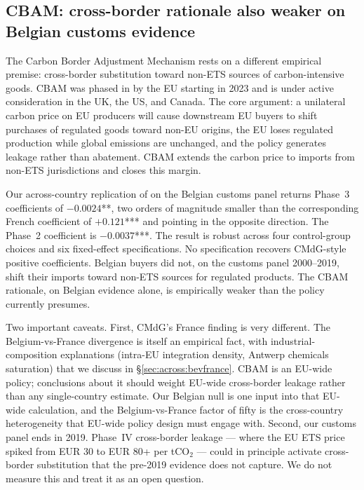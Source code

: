 \subsection{CBAM: cross-border rationale also weaker on Belgian customs evidence}

The Carbon Border Adjustment Mechanism rests on a different empirical premise: cross-border substitution toward non-ETS sources of carbon-intensive goods. CBAM was phased in by the EU starting in 2023 and is under active consideration in the UK, the US, and Canada. The core argument: a unilateral carbon price on EU producers will cause downstream EU buyers to shift purchases of regulated goods toward non-EU origins, the EU loses regulated production while global emissions are unchanged, and the policy generates leakage rather than abatement. CBAM extends the carbon price to imports from non-ETS jurisdictions and closes this margin.

Our across-country replication of \citet{CosterMejeanDiGiovanni2024} on the Belgian customs panel returns Phase~3 coefficients of $-0.0024$**, two orders of magnitude smaller than the corresponding French coefficient of $+0.121$*** and pointing in the opposite direction. The Phase~2 coefficient is $-0.0037$***. The result is robust across four control-group choices and six fixed-effect specifications. No specification recovers CMdG-style positive coefficients. Belgian buyers did not, on the customs panel 2000--2019, shift their imports toward non-ETS sources for regulated products. The CBAM rationale, on Belgian evidence alone, is empirically weaker than the policy currently presumes.

Two important caveats. First, CMdG's France finding is very different. The Belgium-vs-France divergence is itself an empirical fact, with industrial-composition explanations (intra-EU integration density, Antwerp chemicals saturation) that we discuss in \S\ref{sec:across:bevfrance}. CBAM is an EU-wide policy; conclusions about it should weight EU-wide cross-border leakage rather than any single-country estimate. Our Belgian null is one input into that EU-wide calculation, and the Belgium-vs-France factor of fifty is the cross-country heterogeneity that EU-wide policy design must engage with. Second, our customs panel ends in 2019. Phase~IV cross-border leakage --- where the EU ETS price spiked from EUR 30 to EUR 80+ per tCO$_2$ --- could in principle activate cross-border substitution that the pre-2019 evidence does not capture. We do not measure this and treat it as an open question.

